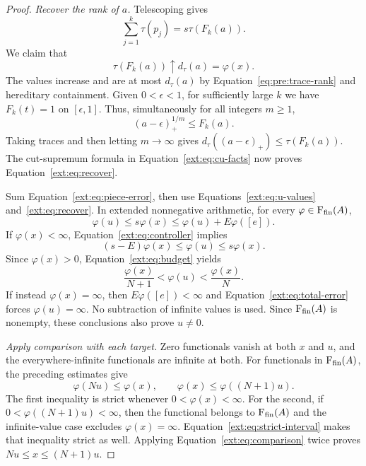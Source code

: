 \begin{proof}
\medskip\noindent
\textit{Recover the rank of $a$.}
Telescoping gives
\[
 \sum_{j=1}^k\tau(p_j)=s\tau(F_k(a)).
\]
We claim that
\begin{equation}
\label{ext:eq:recover}
 \tau(F_k(a))\uparrow d_\tau(a)=\varphi(x).
\end{equation}
The values increase and are at most $d_\tau(a)$ by
Equation~\eqref{eq:pre:trace-rank} and hereditary containment.
Given $0<\epsilon<1$, for sufficiently large $k$ we have
$F_k(t)=1$ on $[\epsilon,1]$. Thus, simultaneously for all
integers $m\ge1$,
\[
 (a-\epsilon)_+^{1/m}\le F_k(a).
\]
Taking traces and then letting $m\to\infty$ gives
$d_\tau((a-\epsilon)_+)\le\tau(F_k(a))$.
The cut-supremum formula in Equation~\eqref{ext:eq:cu-facts} now proves
Equation~\eqref{ext:eq:recover}.

Sum Equation~\eqref{ext:eq:piece-error}, then use
Equations~\eqref{ext:eq:u-values} and~\eqref{ext:eq:recover}. In extended
nonnegative arithmetic, for every $\varphi\in\mathrm F_{\mathrm{fin}}(A)$,
\begin{equation}
\label{ext:eq:total-error}
 \varphi(u)\le s\varphi(x)
 \le\varphi(u)+E\varphi([e]).
\end{equation}
If $\varphi(x)<\infty$, Equation~\eqref{ext:eq:controller} implies
\[
 (s-E)\varphi(x)\le\varphi(u)\le s\varphi(x).
\]
Since $\varphi(x)>0$, Equation~\eqref{ext:eq:budget} yields
\begin{equation}
\label{ext:eq:strict-interval}
 \frac{\varphi(x)}{N+1}<\varphi(u)<\frac{\varphi(x)}N.
\end{equation}
If instead $\varphi(x)=\infty$, then
$E\varphi([e])<\infty$ and Equation~\eqref{ext:eq:total-error} forces
$\varphi(u)=\infty$. No subtraction of infinite values is used.
Since $\mathrm F_{\mathrm{fin}}(A)$ is nonempty, these conclusions also prove $u\ne0$.

\medskip\noindent
\textit{Apply comparison with each target.}
Zero functionals vanish at both $x$ and $u$, and the
everywhere-infinite functionals are infinite at both.
For functionals in $\mathrm F_{\mathrm{fin}}(A)$, the preceding estimates give
\[
 \varphi(Nu)\le\varphi(x),\qquad
 \varphi(x)\le\varphi((N+1)u).
\]
The first inequality is strict whenever $0<\varphi(x)<\infty$.
For the second, if $0<\varphi((N+1)u)<\infty$, then the functional
belongs to $\mathrm F_{\mathrm{fin}}(A)$ and the infinite-value case excludes
$\varphi(x)=\infty$. Equation~\eqref{ext:eq:strict-interval} makes
that inequality strict as well. Applying
Equation~\eqref{ext:eq:comparison} twice proves
$Nu\le x\le(N+1)u$.
\end{proof}


